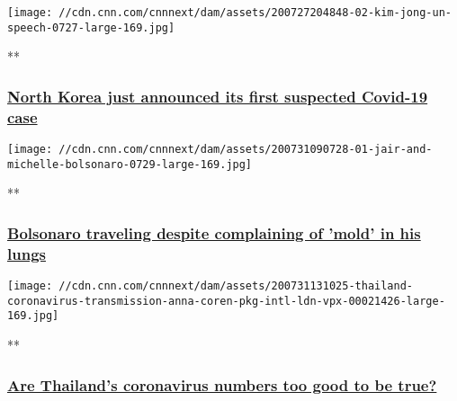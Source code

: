 \href{/videos/world/2020/08/01/north-korea-coronavirus-ripley-pkg-vpx.cnn/video/playlists/coronavirus-intl/}{}

\texttt{[image: //cdn.cnn.com/cnnnext/dam/assets/200727204848-02-kim-jong-un-speech-0727-large-169.jpg]}

**

\hypertarget{north-korea-just-announced-its-first-suspected-covid-19-case-}{%
\subsubsection{\texorpdfstring{\href{/videos/world/2020/08/01/north-korea-coronavirus-ripley-pkg-vpx.cnn/video/playlists/coronavirus-intl/}{North
Korea just announced its first suspected Covid-19 case
}}{North Korea just announced its first suspected Covid-19 case }}\label{north-korea-just-announced-its-first-suspected-covid-19-case-}}

\href{/videos/world/2020/07/31/brazil-jair-michelle-bolsonaro-traveling-coronavirus-infection-lungs-npw-tsr-intl-vpx.cnn/video/playlists/coronavirus-intl/}{}

\texttt{[image: //cdn.cnn.com/cnnnext/dam/assets/200731090728-01-jair-and-michelle-bolsonaro-0729-large-169.jpg]}

**

\hypertarget{bolsonaro-traveling-despite-complaining-of-mold-in-his-lungs}{%
\subsubsection{\texorpdfstring{\href{/videos/world/2020/07/31/brazil-jair-michelle-bolsonaro-traveling-coronavirus-infection-lungs-npw-tsr-intl-vpx.cnn/video/playlists/coronavirus-intl/}{Bolsonaro
traveling despite complaining of 'mold' in his
lungs}}{Bolsonaro traveling despite complaining of 'mold' in his lungs}}\label{bolsonaro-traveling-despite-complaining-of-mold-in-his-lungs}}

\href{/videos/world/2020/07/31/thailand-coronavirus-transmission-anna-coren-pkg-intl-ldn-vpx.cnn/video/playlists/coronavirus-intl/}{}

\texttt{[image: //cdn.cnn.com/cnnnext/dam/assets/200731131025-thailand-coronavirus-transmission-anna-coren-pkg-intl-ldn-vpx-00021426-large-169.jpg]}

**

\hypertarget{are-thailands-coronavirus-numbers-too-good-to-be-true-}{%
\subsubsection{\texorpdfstring{\href{/videos/world/2020/07/31/thailand-coronavirus-transmission-anna-coren-pkg-intl-ldn-vpx.cnn/video/playlists/coronavirus-intl/}{Are
Thailand's coronavirus numbers too good to be true?
}}{Are Thailand's coronavirus numbers too good to be true? }}\label{are-thailands-coronavirus-numbers-too-good-to-be-true-}}

